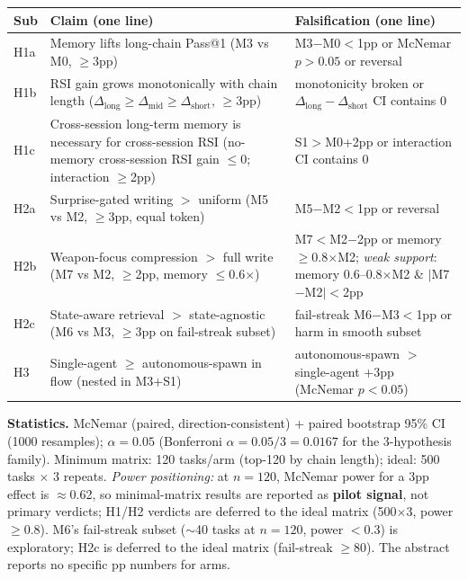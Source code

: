 \begin{center}
\scriptsize
\setlength{\tabcolsep}{3pt}
\begin{tabularx}{\columnwidth}{@{}lXX@{}}
\toprule
\textbf{Sub} & \textbf{Claim (one line)} & \textbf{Falsification (one line)} \\
\midrule
H1a & Memory lifts long-chain Pass@1 (M3 vs M0, $\geq$3pp) & M3$-$M0$<$1pp or McNemar $p>0.05$ or reversal \\
H1b & RSI gain grows monotonically with chain length ($\Delta_{\text{long}}\geq\Delta_{\text{mid}}\geq\Delta_{\text{short}}$, $\geq$3pp) & monotonicity broken or $\Delta_{\text{long}}-\Delta_{\text{short}}$ CI contains 0 \\
H1c & Cross-session long-term memory is necessary for cross-session RSI (no-memory cross-session RSI gain $\leq$0; interaction $\geq$2pp) & S1$>$M0+2pp or interaction CI contains 0 \\
\midrule
H2a & Surprise-gated writing $>$ uniform (M5 vs M2, $\geq$3pp, equal token) & M5$-$M2$<$1pp or reversal \\
H2b & Weapon-focus compression $>$ full write (M7 vs M2, $\geq$2pp, memory $\leq$0.6$\times$) & M7$<$M2$-$2pp or memory $\geq$0.8$\times$M2; {\em weak support}: memory 0.6--0.8$\times$M2 \& $|$M7$-$M2$|<$2pp \\
H2c & State-aware retrieval $>$ state-agnostic (M6 vs M3, $\geq$3pp on fail-streak subset) & fail-streak M6$-$M3$<$1pp or harm in smooth subset \\
\midrule
H3 & Single-agent $\geq$ autonomous-spawn in flow (nested in M3+S1) & autonomous-spawn $>$ single-agent +3pp (McNemar $p<0.05$) \\
\bottomrule
\end{tabularx}
\end{center}

\textbf{Statistics.} McNemar (paired, direction-consistent) + paired bootstrap 95\% CI (1000 resamples); $\alpha=0.05$ (Bonferroni $\alpha=0.05/3=0.0167$ for the 3-hypothesis family). Minimum matrix: 120 tasks/arm (top-120 by chain length); ideal: 500 tasks $\times$ 3 repeats. \emph{Power positioning:} at $n{=}120$, McNemar power for a 3pp effect is $\approx$0.62, so minimal-matrix results are reported as \textbf{pilot signal}, not primary verdicts; H1/H2 verdicts are deferred to the ideal matrix (500$\times$3, power $\geq$0.8). M6's fail-streak subset ($\sim$40 tasks at $n{=}120$, power $<$0.3) is exploratory; H2c is deferred to the ideal matrix (fail-streak $\geq$80). The abstract reports no specific pp numbers for arms.

